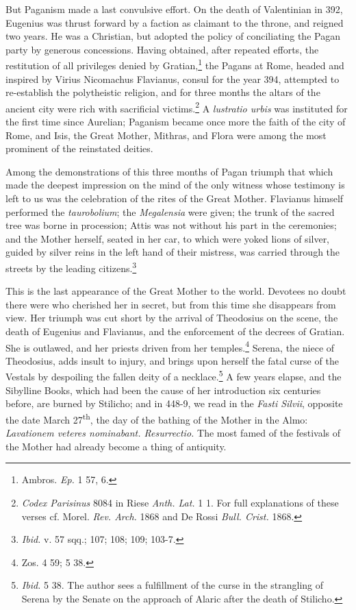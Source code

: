 \documentclass[a4paper, 11pt, oneside, polutonikogreek, english]{article}
\begin{document}
But Paganism made a last convulsive effort. On the death of Valentinian in 392, Eugenius was thrust forward by a faction as claimant to the throne, and reigned two years. He was a Christian, but adopted the policy of conciliating the Pagan party by generous concessions. Having obtained, after repeated efforts, the restitution of all privileges denied by Gratian,\footnote{Ambros. \emph{Ep.} 1 57, 6.} the Pagans at Rome, headed and inspired by Virius Nicomachus Flavianus, consul for the year 394, attempted to re-establish the polytheistic religion, and for three months the altars of the ancient city were rich with sacrificial victims.\footnote{\emph{Codex Parisinus} 8084 in Riese \emph{Anth. Lat.} 1 1. For full explanations of these verses cf. Morel. \emph{Rev. Arch.} 1868 and De Rossi \emph{Bull. Crist.} 1868.} A \emph{lustratio urbis} was instituted for the first time since Aurelian; Paganism became once more the faith of the city of Rome, and Isis, the Great Mother, Mithras, and Flora were among the most prominent of the reinstated deities.

Among the demonstrations of this three months of Pagan triumph that which made the deepest impression on the mind of the only witness whose testimony is left to us was the celebration of the rites of the Great Mother. Flavianus himself performed the \emph{taurobolium}; the \emph{Megalensia} were given; the trunk of the sacred tree was borne in procession; Attis was not without his part in the ceremonies; and the Mother herself, seated in her car, to which were yoked lions of silver, guided by silver reins in the left hand of their mistress, was carried through the streets by the leading citizens.\footnote{\emph{Ibid.} v. 57 sqq.; 107; 108; 109; 103-7.}

This is the last appearance of the Great Mother to the world. Devotees no doubt there were who cherished her in secret, but from this time she disappears from view. Her triumph was cut short by the arrival of Theodosius on the scene, the death of Eugenius and Flavianus, and the enforcement of the decrees of Gratian. She is outlawed, and her priests driven from her temples.\footnote{Zos. 4 59; 5 38.} Serena, the niece of Theodosius, adds insult to injury, and brings upon herself the fatal curse of the Vestals by despoiling the fallen deity of a necklace.\footnote{\emph{Ibid.} 5 38. The author sees a fulfillment of the curse in the strangling of Serena by the Senate on the approach of Alaric after the death of Stilicho.} A few years elapse, and the Sibylline Books, which had been the cause of her introduction six centuries before, are burned by Stilicho; and in 448-9, we read in the \emph{Fasti Silvii}, opposite the date March 27\textsuperscript{th}, the day of the bathing of the Mother in the Almo: \emph{Lavationem veteres nominabant. Resurrectio.} The most famed of the festivals of the Mother had already become a thing of antiquity.
\end{document}
